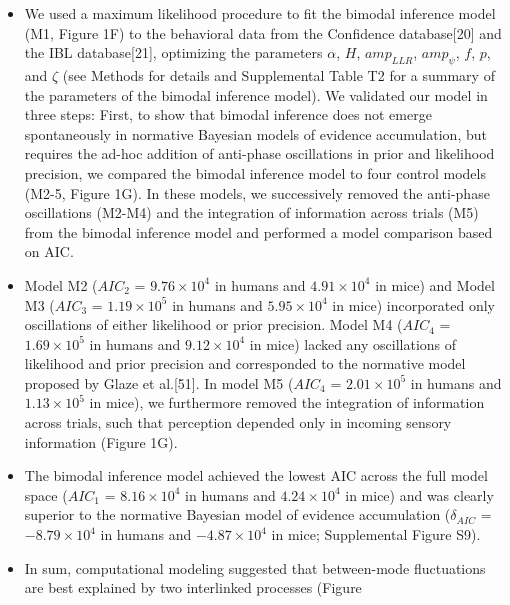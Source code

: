 \documentclass[
]{article}
\begin{document}
\begin{itemize}
\item
  We used a maximum likelihood procedure to fit the bimodal inference
  model (M1, Figure 1F) to the behavioral data from the Confidence
  database{[}20{]} and the IBL database{[}21{]}, optimizing the
  parameters \(\alpha\), \(H\), \(amp_{LLR}\), \(amp_{\psi}\), \(f\),
  \(p\), and \(\zeta\) (see Methods for details and Supplemental Table
  T2 for a summary of the parameters of the bimodal inference model). We
  validated our model in three steps: First, to show that bimodal
  inference does not emerge spontaneously in normative Bayesian models
  of evidence accumulation, but requires the ad-hoc addition of
  anti-phase oscillations in prior and likelihood precision, we compared
  the bimodal inference model to four control models (M2-5, Figure 1G).
  In these models, we successively removed the anti-phase oscillations
  (M2-M4) and the integration of information across trials (M5) from the
  bimodal inference model and performed a model comparison based on AIC.
\item
  Model M2 (\(AIC_2\) = \(\ensuremath{9.76\times 10^{4}}\) in humans and
  \(\ensuremath{4.91\times 10^{4}}\) in mice) and Model M3 (\(AIC_3\) =
  \(\ensuremath{1.19\times 10^{5}}\) in humans and
  \(\ensuremath{5.95\times 10^{4}}\) in mice) incorporated only
  oscillations of either likelihood or prior precision. Model M4
  (\(AIC_4\) = \(\ensuremath{1.69\times 10^{5}}\) in humans and
  \(\ensuremath{9.12\times 10^{4}}\) in mice) lacked any oscillations of
  likelihood and prior precision and corresponded to the normative model
  proposed by Glaze et al.{[}51{]}. In model M5 (\(AIC_4\) =
  \(\ensuremath{2.01\times 10^{5}}\) in humans and
  \(\ensuremath{1.13\times 10^{5}}\) in mice), we furthermore removed
  the integration of information across trials, such that perception
  depended only in incoming sensory information (Figure 1G).
\item
  The bimodal inference model achieved the lowest AIC across the full
  model space (\(AIC_1\) = \(\ensuremath{8.16\times 10^{4}}\) in humans
  and \(\ensuremath{4.24\times 10^{4}}\) in mice) and was clearly
  superior to the normative Bayesian model of evidence accumulation
  (\(\delta_{AIC}\) = \(\ensuremath{-8.79\times 10^{4}}\) in humans and
  \(\ensuremath{-4.87\times 10^{4}}\) in mice; Supplemental Figure S9).
\item
  In sum, computational modeling suggested that between-mode
  fluctuations are best explained by two interlinked processes (Figure

\end{itemize}
\end{document}
